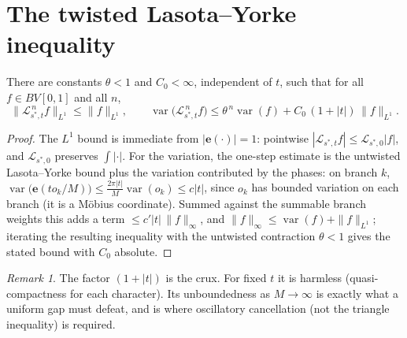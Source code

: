 \documentclass[11pt]{article}
\theoremstyle{definition}\newtheorem{definition}{Definition}
\theoremstyle{remark}\newtheorem{remark}{Remark}
\newcommand{\Lop}{\mathcal L}\newcommand{\var}{\operatorname{var}}\newcommand{\e}{\mathbf e}
\begin{document}
\section{The twisted Lasota--Yorke inequality}
\begin{proposition}\label{prop:LY}
There are constants $\theta<1$ and $C_0<\infty$, independent of $t$, such that
for all $f\in BV[0,1]$ and all $n$,
\[
\|\Lop_{s^\ast,t}^{\,n}f\|_{L^1}\le \|f\|_{L^1},\qquad
\var\big(\Lop_{s^\ast,t}^{\,n}f\big)\le \theta^{\,n}\var(f)+C_0\,(1+|t|)\,\|f\|_{L^1}.
\]
\end{proposition}
\begin{proof}
The $L^1$ bound is immediate from $|\e(\cdot)|=1$: pointwise
$|\Lop_{s^\ast,t}f|\le \Lop_{s^\ast,0}|f|$, and $\Lop_{s^\ast,0}$ preserves
$\int|\cdot|$. For the variation, the one-step estimate is the untwisted
Lasota--Yorke bound plus the variation contributed by the phases: on branch
$k$, $\var\big(\e(t o_k/M)\big)\le \tfrac{2\pi|t|}{M}\var(o_k)\le c|t|$, since
$o_k$ has bounded variation on each branch (it is a M\"obius coordinate).
Summed against the summable branch weights this adds a term $\le c'|t|\,
\|f\|_\infty$, and $\|f\|_\infty\le \var(f)+\|f\|_{L^1}$; iterating the
resulting inequality with the untwisted contraction $\theta<1$ gives the
stated bound with $C_0$ absolute.
\end{proof}
\begin{remark}
The factor $(1+|t|)$ is the crux. For fixed $t$ it is harmless
(quasi-compactness for each character). Its unboundedness as $M\to\infty$ is
exactly what a uniform gap must defeat, and is where oscillatory cancellation
(not the triangle inequality) is required.
\end{remark}
\end{document}
